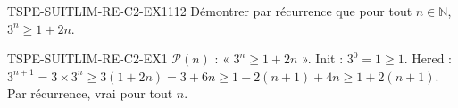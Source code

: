

\begin{exercice}{TSPE-SUITLIM-RE-C2-EX1}{1}{12}
Démontrer par récurrence que pour tout $n \in \mathbb{N}$, $3^n \geq 1 + 2n$.
\end{exercice}


\begin{corrige}{TSPE-SUITLIM-RE-C2-EX1}
$\mathcal{P}(n)$ : « $3^n \geq 1+2n$ ». Init : $3^0=1 \geq 1$. Hered : $3^{n+1} = 3 \times 3^n \geq 3(1+2n) = 3+6n \geq 1+2(n+1)+4n \geq 1+2(n+1)$. Par récurrence, vrai pour tout $n$.
\end{corrige}
